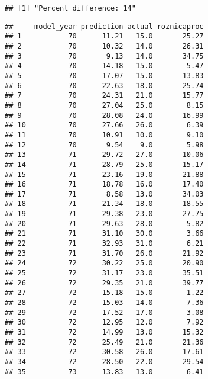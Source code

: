 \documentclass[
]{article}
\newenvironment{Shaded}{\begin{snugshade}}{\end{snugshade}}
\newcommand{\DecValTok}[1]{\textcolor[rgb]{0.00,0.00,0.81}{#1}}
\newcommand{\KeywordTok}[1]{\textcolor[rgb]{0.13,0.29,0.53}{\textbf{#1}}}
\newcommand{\NormalTok}[1]{#1}
\newcommand{\OperatorTok}[1]{\textcolor[rgb]{0.81,0.36,0.00}{\textbf{#1}}}
\newcommand{\StringTok}[1]{\textcolor[rgb]{0.31,0.60,0.02}{#1}}
\begin{document}
\begin{verbatim}
## [1] "Percent difference: 14"
\end{verbatim}

\begin{Shaded}
\end{Shaded}

\begin{verbatim}
##     model_year prediction actual roznicaproc
## 1           70      11.21   15.0       25.27
## 2           70      10.32   14.0       26.31
## 3           70       9.13   14.0       34.75
## 4           70      14.18   15.0        5.47
## 5           70      17.07   15.0       13.83
## 6           70      22.63   18.0       25.74
## 7           70      24.31   21.0       15.77
## 8           70      27.04   25.0        8.15
## 9           70      28.08   24.0       16.99
## 10          70      27.66   26.0        6.39
## 11          70      10.91   10.0        9.10
## 12          70       9.54    9.0        5.98
## 13          71      29.72   27.0       10.06
## 14          71      28.79   25.0       15.17
## 15          71      23.16   19.0       21.88
## 16          71      18.78   16.0       17.40
## 17          71       8.58   13.0       34.03
## 18          71      21.34   18.0       18.55
## 19          71      29.38   23.0       27.75
## 20          71      29.63   28.0        5.82
## 21          71      31.10   30.0        3.66
## 22          71      32.93   31.0        6.21
## 23          71      31.70   26.0       21.92
## 24          72      30.22   25.0       20.90
## 25          72      31.17   23.0       35.51
## 26          72      29.35   21.0       39.77
## 27          72      15.18   15.0        1.22
## 28          72      15.03   14.0        7.36
## 29          72      17.52   17.0        3.08
## 30          72      12.95   12.0        7.92
## 31          72      14.99   13.0       15.32
## 32          72      25.49   21.0       21.36
## 33          72      30.58   26.0       17.61
## 34          72      28.50   22.0       29.54
## 35          73      13.83   13.0        6.41

\end{verbatim}
\end{document}
